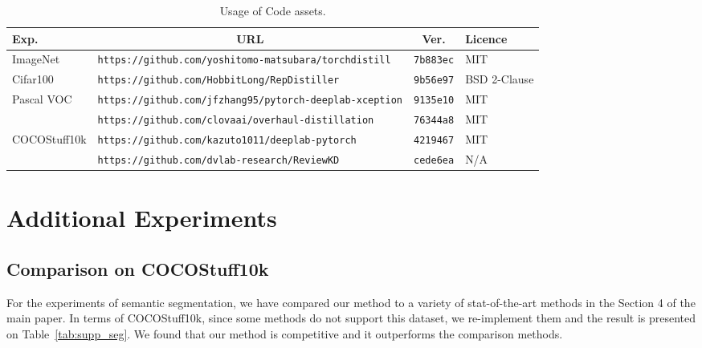 \documentclass[10pt,onecolumn,letterpaper]{article}
\begin{document}
\begin{table*}[h]
    \centering
    \caption{Usage of Code assets.}
    \begin{tabular}{l|l|c|l}
        \toprule
         Exp.&\multicolumn{1}{c|}{URL} &Ver. &Licence \\\midrule
         ImageNet&{\tt \small https://github.com/yoshitomo-matsubara/torchdistill} &{\tt \small 7b883ec} &MIT\\ \midrule
         Cifar100&{\tt \small https://github.com/HobbitLong/RepDistiller}&{\tt \small 9b56e97} &BSD 2-Clause \\ \midrule
         \multirow{2}{*}{Pascal VOC}&{\tt \small https://github.com/jfzhang95/pytorch-deeplab-xception}&{\tt \small 9135e10} & MIT\\
         &{\tt \small https://github.com/clovaai/overhaul-distillation} &{\tt \small 76344a8} &MIT\\ \midrule
         \multirow{2}{*}{COCOStuff10k} &{\tt \small https://github.com/kazuto1011/deeplab-pytorch} &{\tt \small 4219467} &MIT\\
         &{\tt \small https://github.com/dvlab-research/ReviewKD} &{\tt \small cede6ea} &N/A\\
        \bottomrule
    \end{tabular}
    \label{tab:my_label}
\end{table*}





\section{Additional Experiments}
\subsection{Comparison on COCOStuff10k}
For the experiments of semantic segmentation, we have compared our method to a variety of stat-of-the-art methods in the Section 4 of the main paper. In terms of COCOStuff10k, since some methods do not support this dataset, we re-implement them and the result is presented on Table~\ref{tab:supp_seg}. We found that our method is competitive and it outperforms the comparison methods.
\end{document}
